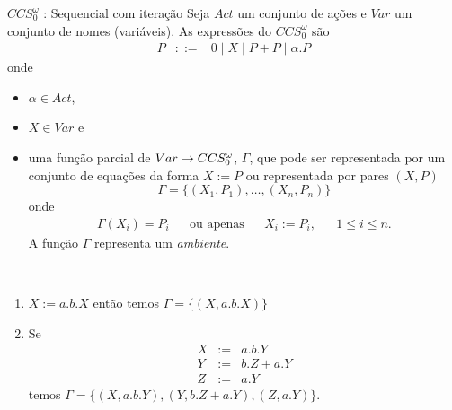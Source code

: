 \documentclass[aspectratio=169]{beamer}
\begin{document}
	\begin{frame}{$CCS_0^\omega$ : Sequencial com iteração}
	Seja $Act$ um conjunto de ações e $Var$ um conjunto de nomes (variáveis). As expressões do $CCS_0^\omega$ são
\begin{eqnarray*}
P&::=& 0 \mid X \mid P+P \mid \alpha.P
\end{eqnarray*}
onde 
\begin{itemize}
	\item 
$
\alpha \in Act$, 
\item $X\in Var$ e 
\item uma função  parcial de $Var \rightarrow CCS_0^\omega$, \alert{$\Gamma$}, que pode ser representada por um conjunto   de equações da forma $X:=P$ ou representada por pares $(X,P)$
$$\Gamma=\{(X_1,P_1),\ldots, (X_n,P_n)\}$$
onde\\[-10mm]
\begin{align*}
	\Gamma(X_i)=P_i && \text{ou apenas} &&X_i:= P_i, && 1\leq i\leq n. \end{align*}
A função $\Gamma$ representa um \emph{ambiente}.
\end{itemize}
\end{frame}

\begin{frame}
\begin{exem}\ 
\begin{enumerate}[<+->]
	\item $X:=a.b.X$ então temos $\Gamma=\{(X,a.b.X)\}$
\item  Se \begin{eqnarray*}
 X&:=& a.b.Y\\
Y&:= & b.Z +a.Y\\
	Z&:=& a.Y
 \end{eqnarray*}
temos $\Gamma=\{(X,a.b.Y),(Y,b.Z+a.Y),(Z,a.Y)\}$.
\end{enumerate}
\end{exem}
\end{frame}
\end{document}
